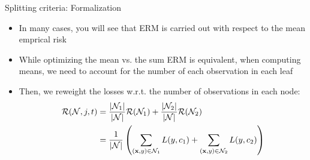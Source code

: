 \documentclass[11pt,compress,t,notes=noshow, xcolor=table]{beamer}
\begin{document}
\begin{vbframe}{Splitting criteria: Formalization}
\framebreak
\begin{itemize}

\item In many cases, you will see that ERM is carried out with respect to the mean emprical risk
\item While optimizing the mean vs. the sum ERM is equivalent, when computing means, we need to account for the number of each observation in each leaf
\item Then, we reweight the losses w.r.t. the number of observations in each node:
     \begin{align*}
      \mathcal{R}(\mathcal{N}, j, t) &= \frac{|\mathcal{N}_1|}{|\mathcal{N}|} \mathcal{R}(\mathcal{N}_1) + \frac{|\mathcal{N}_2|}{|\mathcal{N}|} \mathcal{R}(\mathcal{N}_2) \\
                  &= \frac{1}{|\mathcal{N}|}\left(\sum\limits_{(\mathbf{x},y) \in \mathcal{N}_1} L(y, c_1) + \sum\limits_{(\mathbf{x},y) \in \mathcal{N}_2} L(y, c_2)\right)
      \end{align*}

\end{itemize}
\end{vbframe}



\endlecture
\end{document}
